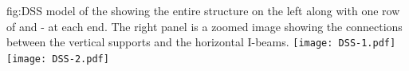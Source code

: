 \begin{dunefigure}{fig:DSS}
  {\threed model of the  showing the entire
  structure on the left along with one row of  and
  - at each end. The right panel is a zoomed image
  showing the connections between the vertical supports and the
  horizontal I-beams.}
\texttt{[image: DSS-1.pdf]}
 \texttt{[image: DSS-2.pdf]}
\end{dunefigure}

